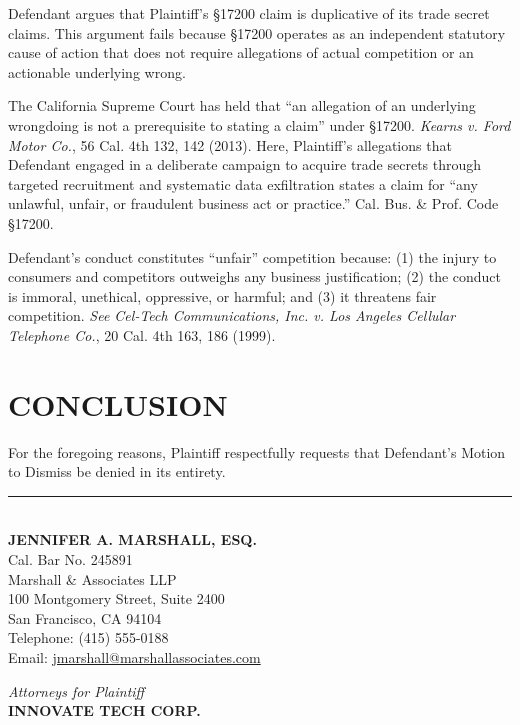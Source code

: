 \documentclass[
    language=english,
    doctype=legal-brief,
    institution=none,
]{../../omnilatex}
\begin{document}
Defendant argues that Plaintiff's \S 17200 claim is duplicative of its trade secret claims. This argument fails because \S 17200 operates as an independent statutory cause of action that does not require allegations of actual competition or an actionable underlying wrong.

The California Supreme Court has held that ``an allegation of an underlying wrongdoing is not a prerequisite to stating a claim'' under \S 17200. \textit{Kearns v. Ford Motor Co.}, 56 Cal. 4th 132, 142 (2013). Here, Plaintiff's allegations that Defendant engaged in a deliberate campaign to acquire trade secrets through targeted recruitment and systematic data exfiltration states a claim for ``any unlawful, unfair, or fraudulent business act or practice.'' Cal. Bus. \& Prof. Code \S 17200.

Defendant's conduct constitutes ``unfair'' competition because: (1) the injury to consumers and competitors outweighs any business justification; (2) the conduct is immoral, unethical, oppressive, or harmful; and (3) it threatens fair competition. \textit{See Cel-Tech Communications, Inc. v. Los Angeles Cellular Telephone Co.}, 20 Cal. 4th 163, 186 (1999).

\section{CONCLUSION}

For the foregoing reasons, Plaintiff respectfully requests that Defendant's Motion to Dismiss be denied in its entirety.

\vspace{2cm}

\noindent\rule{6cm}{0.4pt}\\
\textbf{JENNIFER A. MARSHALL, ESQ.}\\
Cal. Bar No. 245891\\
Marshall \& Associates LLP\\
100 Montgomery Street, Suite 2400\\
San Francisco, CA 94104\\
Telephone: (415) 555-0188\\
Email: \url{jmarshall@marshallassociates.com}

\vspace{1cm}

\noindent\textit{Attorneys for Plaintiff}\\
\textbf{INNOVATE TECH CORP.}
\end{document}
